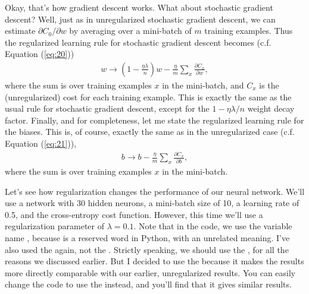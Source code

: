 \documentclass[a4paper,twoside,10pt]{book}
\begin{document}
Okay, that's how gradient descent works. What about stochastic gradient descent? Well, just as in unregularized stochastic gradient descent, we can estimate $\partial{}C_0/\partial{}w$ by averaging over a mini-batch of $m$ training examples. Thus the regularized learning rule for stochastic gradient descent becomes (c.f. Equation (\ref{eq:20}))
\begin{eqnarray} 
w \rightarrow \left(1-\frac{\eta \lambda}{n}\right) w -\frac{\eta}{m} \sum_x \frac{\partial C_x}{\partial w}, 
\label{eq:93}
\end{eqnarray}
where the sum is over training examples $x$ in the mini-batch, and $C_x$ is the (unregularized) cost for each training example. This is exactly the same as the usual rule for stochastic gradient descent, except for the $1−\eta\lambda/n$ weight decay factor. Finally, and for completeness, let me state the regularized learning rule for the biases. This is, of course, exactly the same as in the unregularized case (c.f. Equation (\ref{eq:21})),
\begin{eqnarray}
	b \to b - \frac{\eta}{m} \sum_x \frac{\partial C_x}{\partial b},
	\label{eq:94}
\end{eqnarray}
where the sum is over training examples $x$ in the mini-batch.

Let's see how regularization changes the performance of our neural network. We'll use a network with 30 hidden neurons, a mini-batch size of 10, a learning rate of 0.5, and the cross-entropy cost function. However, this time we'll use a regularization parameter of $\lambda =0.1$. Note that in the code, we use the variable name , because  is a reserved word in Python, with an unrelated meaning. I've also used the  again, not the . Strictly speaking, we should use the , for all the reasons we discussed earlier. But I decided to use the  because it makes the results more directly comparable with our earlier, unregularized results. You can easily change the code to use the  instead, and you'll find that it gives similar results.
\end{document}
